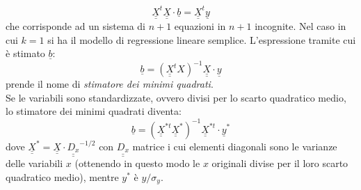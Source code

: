 \documentclass[]{article}
\def\doubleunderline#1{\underline{\underline{#1}}}
\begin{document}
\begin{equation}
\doubleunderline{X}^t \doubleunderline{X} \cdot \underline{b} = \doubleunderline{X}^t \underline{y}
\end{equation}
che corrisponde ad un sistema di $n+1$ equazioni in $n+1$ incognite. Nel caso in cui $k = 1$ si ha il modello di regressione lineare semplice. L'espressione tramite cui è stimato $\underline{b}$:
\begin{equation}
\underline{b} = (\doubleunderline{X}^t X)^{-1} \doubleunderline{X} \cdot \underline{y}
\end{equation}
prende il nome di \textit{stimatore dei minimi quadrati}.\\
Se le variabili sono standardizzate, ovvero divisi per lo scarto quadratico medio, lo stimatore dei minimi quadrati diventa:
\begin{equation}
\underline{b} = (\doubleunderline{X}^{*t} \doubleunderline{X}^*)^{-1} \doubleunderline{X}^{*t} \cdot \underline{y}^*
\end{equation}
dove $\doubleunderline{X}^* = \doubleunderline{X} \cdot \doubleunderline{D_x}^{-1/2}$ con $\doubleunderline{D_x}$ matrice i cui elementi diagonali sono le varianze delle variabili $x$ (ottenendo in questo modo le $x$ originali divise per il loro scarto quadratico medio), mentre $y^*$ è $y/\sigma_y$.
\end{document}

